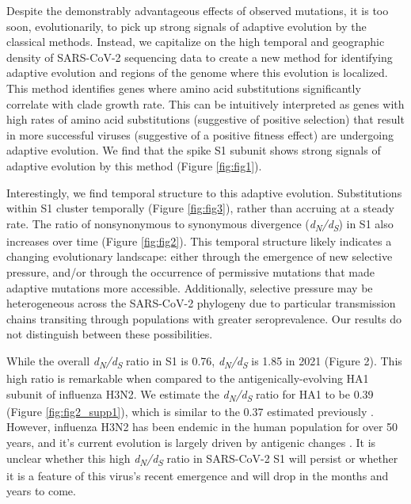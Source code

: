\documentclass[12pt, letterpaper]{article}
\begin{document}
Despite the demonstrably advantageous effects of observed mutations, it is too soon, evolutionarily, to pick up strong signals of adaptive evolution by the classical methods. Instead, we capitalize on the high temporal and geographic density of SARS-CoV-2 sequencing data to create a new method for identifying adaptive evolution and regions of the genome where this evolution is localized. This method identifies genes where amino acid substitutions significantly correlate with clade growth rate. This can be intuitively interpreted as genes with high rates of amino acid substitutions (suggestive of positive selection) that result in more successful viruses (suggestive of a positive fitness effect) are undergoing adaptive evolution. We find that the spike S1 subunit shows strong signals of adaptive evolution by this method (Figure \ref{fig:fig1}).

Interestingly, we find temporal structure to this adaptive evolution. Substitutions within S1 cluster temporally (Figure \ref{fig:fig3}), rather than accruing at a steady rate. The ratio of nonsynonymous to synonymous divergence (\emph{d\textsubscript{N}/d\textsubscript{S}}) in S1 also increases over time (Figure \ref{fig:fig2}). This temporal structure likely indicates a changing evolutionary landscape: either through the emergence of new selective pressure, and/or through the occurrence of permissive mutations that made adaptive mutations more accessible. Additionally, selective pressure may be heterogeneous across the SARS-CoV-2 phylogeny due to particular transmission chains transiting through populations with greater seroprevalence. Our results do not distinguish between these possibilities.

 While the overall \emph{d\textsubscript{N}/d\textsubscript{S}} ratio in S1 is 0.76, \emph{d\textsubscript{N}/d\textsubscript{S}} is 1.85 in 2021 (Figure 2). This high ratio is remarkable when compared to the antigenically-evolving HA1 subunit of influenza H3N2. We estimate the \emph{d\textsubscript{N}/d\textsubscript{S}} ratio for HA1 to be 0.39 (Figure \ref{fig:fig2_supp1}), which is similar to the 0.37 estimated previously \citep{Wolf2006-vy}. However, influenza H3N2 has been endemic in the human population for over 50 years, and it’s current evolution is largely driven by antigenic changes \citep{Smith2004-if}. It is unclear whether this high \emph{d\textsubscript{N}/d\textsubscript{S}} ratio in SARS-CoV-2 S1 will persist or whether it is a feature of this virus’s recent emergence and will drop in the months and years to come.
\end{document}
